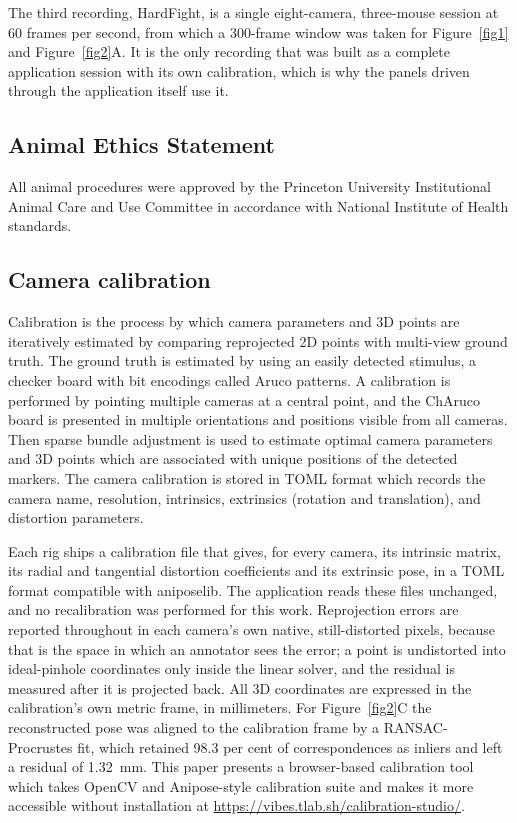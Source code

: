 \documentclass[pdflatex, sn-nature]{sn-jnl}
\theoremstyle{thmstyleone}%
\theoremstyle{thmstyletwo}%
\theoremstyle{thmstylethree}%
\begin{document}
The third recording, HardFight, is a single eight-camera, three-mouse session at 60 frames per second, from which a 300-frame window was taken for Figure~\ref{fig1} and Figure~\ref{fig2}A. It is the only recording that was built as a complete application session with its own calibration, which is why the panels driven through the application itself use it.

\subsection{Animal Ethics Statement}\label{methods-mice}

All animal procedures were approved by the Princeton University Institutional Animal Care and Use Committee in accordance with National Institute of Health standards.


\subsection{Camera calibration}\label{methods-calibration}

Calibration is the process by which camera parameters and 3D points are iteratively estimated by comparing reprojected 2D points with multi-view ground truth. The ground truth is estimated by using an easily detected stimulus, a checker board with bit encodings called Aruco patterns. A calibration is performed by pointing multiple cameras at a central point, and the ChAruco board is presented in multiple orientations and positions visible from all cameras. Then sparse bundle adjustment is used to estimate optimal camera parameters and 3D points which are associated with unique positions of the detected markers. The camera calibration is stored in TOML format which records the camera name, resolution, intrinsics, extrinsics (rotation and translation), and distortion parameters.

Each rig ships a calibration file that gives, for every camera, its intrinsic matrix, its radial and tangential distortion coefficients and its extrinsic pose, in a TOML format compatible with aniposelib. The application reads these files unchanged, and no recalibration was performed for this work. Reprojection errors are reported throughout in each camera's own native, still-distorted pixels, because that is the space in which an annotator sees the error; a point is undistorted into ideal-pinhole coordinates only inside the linear solver, and the residual is measured after it is projected back. All 3D coordinates are expressed in the calibration's own metric frame, in millimeters. For Figure~\ref{fig2}C the reconstructed pose was aligned to the calibration frame by a RANSAC-Procrustes fit, which retained 98.3 per cent of correspondences as inliers and left a residual of 1.32~mm. This paper presents a browser-based calibration tool which takes OpenCV and Anipose-style calibration suite and makes it more accessible without installation at \url{https://vibes.tlab.sh/calibration-studio/}.
\end{document}
